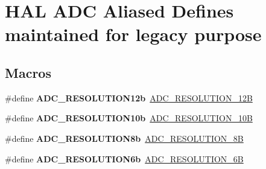 \hypertarget{group___h_a_l___a_d_c___aliased___defines}{}\section{H\+AL A\+DC Aliased Defines maintained for legacy purpose}
\label{group___h_a_l___a_d_c___aliased___defines}
\subsection*{Macros}
\begin{DoxyCompactItemize}
\item 
\mbox{\label{group___h_a_l___a_d_c___aliased___defines_ga6d328c588ea6f273ca698d48441a2a71}} 
\#define {\bfseries A\+D\+C\+\_\+\+R\+E\+S\+O\+L\+U\+T\+I\+O\+N12b}~\hyperlink{group___a_d_c___resolution_ga49c8408a1cdbf97bbf29234c3770fa74}{A\+D\+C\+\_\+\+R\+E\+S\+O\+L\+U\+T\+I\+O\+N\+\_\+12B}
\item 
\mbox{\label{group___h_a_l___a_d_c___aliased___defines_gaa695d7ca46602fd4317d5f6a7a2ee071}} 
\#define {\bfseries A\+D\+C\+\_\+\+R\+E\+S\+O\+L\+U\+T\+I\+O\+N10b}~\hyperlink{group___a_d_c___resolution_ga91289e269eb3080d25301909c0f417e5}{A\+D\+C\+\_\+\+R\+E\+S\+O\+L\+U\+T\+I\+O\+N\+\_\+10B}
\item 
\mbox{\label{group___h_a_l___a_d_c___aliased___defines_ga96b87d1645b3ae2e4af88daa006decc4}} 
\#define {\bfseries A\+D\+C\+\_\+\+R\+E\+S\+O\+L\+U\+T\+I\+O\+N8b}~\hyperlink{group___a_d_c___resolution_ga39925af93719877bdcc5664e4b95e69a}{A\+D\+C\+\_\+\+R\+E\+S\+O\+L\+U\+T\+I\+O\+N\+\_\+8B}
\item 
\mbox{\label{group___h_a_l___a_d_c___aliased___defines_gaeaba9f99d20e7305507044f975925622}} 
\#define {\bfseries A\+D\+C\+\_\+\+R\+E\+S\+O\+L\+U\+T\+I\+O\+N6b}~\hyperlink{group___a_d_c___resolution_ga24c5226e05db78b4065f2f187d497b04}{A\+D\+C\+\_\+\+R\+E\+S\+O\+L\+U\+T\+I\+O\+N\+\_\+6B}
\item 
\mbox{\label{group___h_a_l___a_d_c___aliased___defines_ga46d2fd3222a716456b74ad881eb34039}} 

\end{DoxyCompactItemize}
